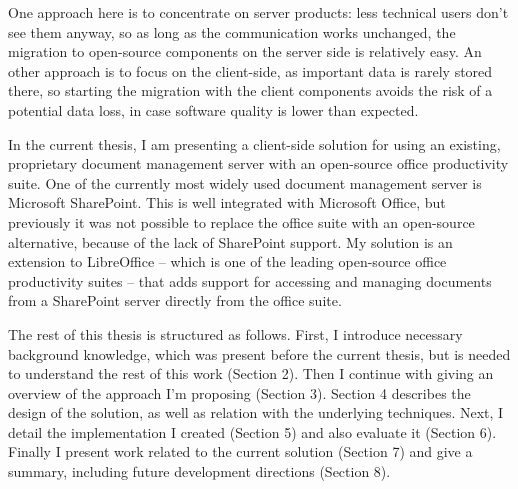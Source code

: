 One approach here is to concentrate on server products: less technical users
don't see them anyway, so as long as the communication works unchanged, the
migration to open-source components on the server side is relatively easy. An
other approach is to focus on the client-side, as important data is rarely
stored there, so starting the migration with the client components avoids the
risk of a potential data loss, in case software quality is lower than expected.

In the current thesis, I am presenting a client-side solution for using an
existing, proprietary document management server with an open-source office
productivity suite. One of the currently most widely used document management
server is Microsoft SharePoint\cite{sharepoint}. This is well integrated with
Microsoft Office, but previously it was not possible to replace the office
suite with an open-source alternative, because of the lack of SharePoint
support. My solution is an extension to LibreOffice -- which is one of the
leading open-source office productivity suites -- that adds support for
accessing and managing documents from a SharePoint server directly from the
office suite.

The rest of this thesis is structured as follows. First, I introduce
necessary background knowledge, which was present before the current thesis,
but is needed to understand the rest of this work (Section 2). Then I continue
with giving an overview of the approach I'm proposing (Section 3). Section 4
describes the design of the solution, as well as relation with the underlying
techniques. Next, I detail the implementation I created (Section 5) and also
evaluate it (Section 6). Finally I present work related to the current solution
(Section 7) and give a summary, including future development directions
(Section 8).
